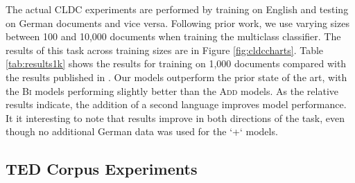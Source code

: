 \documentclass[11pt]{article}
\newcommand{\addMod}{\textsc{Add}\xspace}
\newcommand{\flatMod}{\textsc{Bi}\xspace}
\begin{document}
The actual CLDC experiments are performed by training on English and testing on
German documents and vice versa. Following prior work, we use varying sizes
between 100 and 10,000 documents when training the multiclass classifier. The
results of this task across training sizes are in Figure \ref{fig:cldccharts}.
Table \ref{tab:results1k} shows the results for training on 1,000 documents
compared with the results published in . Our models
outperform the prior state of the art, with the \flatMod models performing
slightly better than the \addMod models. As the relative results indicate, the
addition of a second language improves model performance. It it interesting to
note that results improve in both directions of the task, even though no
additional German data was used for the `+` models.
 
\subsection{TED Corpus Experiments}\label{sec:ted-cldc}
\end{document}

